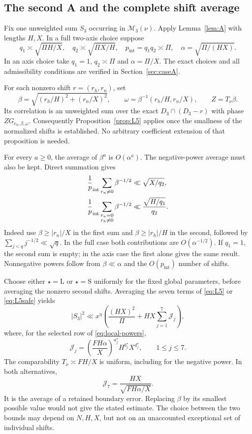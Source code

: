 \documentclass[11pt,a4paper]{article}
\numberwithin{equation}{section}
\theoremstyle{remark}
\newcommand{\pint}{p_{\mathrm{int}}}
\begin{document}
\subsection{The second A and the complete shift average}
Fix one unweighted sum $S_3$ occurring in $\mathcal M_3(\nu)$. Apply
Lemma~\ref{lem:A} with lengths $H,X$. In a full two-axis choice suppose
\[
 q_1\asymp\sqrt{\Pi H/X},\quad
 q_2\asymp\sqrt{\Pi X/H},\quad
 \pint=q_1q_2\asymp\Pi,\quad
 \alpha=\sqrt{\Pi/(HX)}.
\]
In an axis choice take $q_1=1$, $q_2\asymp\Pi$ and $\alpha=\Pi/X$.
The exact choices and all admissibility conditions are verified in
Section~\ref{sec:caseA}.

For each nonzero shift $r=(r_h,r_n)$, set
\[
 \beta=\sqrt{(r_h/H)^2+(r_n/X)^2},\qquad
 \omega=\beta^{-1}(r_h/H,r_n/X),\qquad Z=T_\nu\beta.
\]
Its correlation is an unweighted sum over the exact
$D_3\cap(D_3-r)$ with phase $ZG_{e_0,\beta,\omega}$. Consequently
Proposition~\ref{prop:L5} applies once the smallness of the normalized
shifts is established. No arbitrary coefficient extension of that
proposition is needed.

For every $a\ge0$, the average of $\beta^a$ is $O(\alpha^a)$. The
negative-power average must also be kept. Direct summation gives
\begin{align}
 \frac1\pint\sum_{r_n\ne0}\beta^{-1/2}
       &\ll\sqrt{X/q_2},\label{eq:negative-average}\\
 \frac1\pint\sum_{\substack{r_n=0\\r_h\ne0}}\beta^{-1/2}
       &\ll\frac{\sqrt{H/q_1}}{q_2}.\notag
\end{align}
Indeed use $\beta\ge |r_n|/X$ in the first sum and
$\beta\ge |r_h|/H$ in the second, followed by
$\sum_{j<q}j^{-1/2}\ll\sqrt q$. In the full case both contributions are
$O(\alpha^{-1/2})$. If $q_1=1$, the second sum is empty; in the axis
case the first alone gives the same result. Nonnegative powers follow
from $\beta\ll\alpha$ and the $O(\pint)$ number of shifts.

Choose either $\star=\mathrm L$ or $\star=\mathrm S$ uniformly for
the fixed global parameters, before averaging the nonzero second shifts.
Averaging the seven terms of \eqref{eq:L5} or \eqref{eq:L5safe} yields
\begin{equation}\label{eq:A2}
 |S_3|^2\ll x^\eta\left(\frac{(HX)^2}{\Pi}
                       +HX\sum_{j=1}^7\mathcal J_j\right),
\end{equation}
where, for the selected row of \eqref{eq:local-powers},
\begin{equation}\label{eq:Jterms}
 \mathcal J_j=
 \left(\frac{FH\alpha}{X}\right)^{a_j^\star}
 H^{b_j^\star}X^{d_j^\star},\qquad 1\le j\le7.
\end{equation}
The comparability $T_\nu\asymp FH/X$ is uniform, including for the
negative power. In both alternatives,
\[
 \mathcal J_7=\frac{HX}{\sqrt{FH\alpha/X}}.
\]
It is the average of a retained boundary error. Replacing $\beta$ by its
smallest possible value would not give the stated estimate.
The choice between the two bounds may depend on $N,H,X$, but not on
an unaccounted exceptional set of individual shifts.
\end{document}
